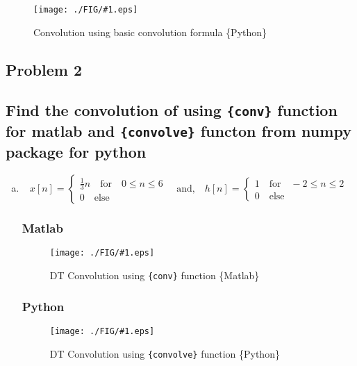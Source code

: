 \documentclass[a4paper,11pt]{article}
\newcommand\ddfrac[2]{\frac{\displaystyle #1}{\displaystyle #2}}
\newcommand{\mobs}[2]{
    \begin{figure}[H]
        \centering
        \texttt{[image: ./FIG/\#1.eps]}
        \caption{#2}
    \end{figure}
   
}
\newcommand{\pobs}[2]{
    \begin{figure}[H]
        \centering
        \texttt{[image: ./FIG/\#1.eps]}
        \caption{#2}
    \end{figure}
   
}
\begin{document}
\pobs{p1p}{Convolution using basic convolution formula \{Python\} }



\subsection{Problem 2}
\subsection*{Find the convolution of using \texttt{\{conv\}} function for matlab and \texttt{\{convolve\}} functon from numpy package for python}



{\begin{enumerate}[a.]
        \item {\begin{equation*}
                  x[n]= \begin{cases}
                      \ddfrac{1}{3}n \quad \text{for} \quad 0\leq n \leq 6 \\
                      0 \quad \text{else}
                  \end{cases}
                  \quad\text{and,}\quad
                  h[n]= \begin{cases}
                      1 \quad \text{for} \quad -2\leq n \leq 2 \\
                      0 \quad \text{else}
                  \end{cases}
              \end{equation*} }


              \subsubsection*{Matlab}
              \mobs{p2a}{DT Convolution using \texttt{\{conv\}} function \{Matlab\} }


              \subsubsection*{Python}
              \pobs{p2ap}{DT Convolution using \texttt{\{convolve\}} function \{Python\} }


\end{enumerate}}
\end{document}
